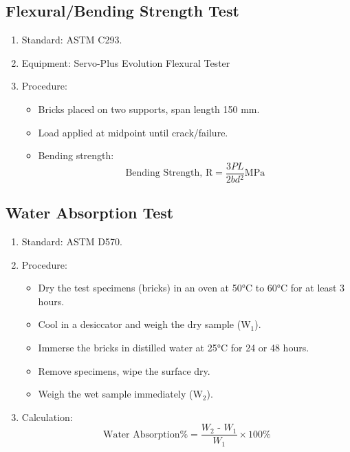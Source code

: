 \subsection{Flexural/Bending Strength Test}
\begin{enumerate}
	\item Standard: ASTM C293.
	\item Equipment: Servo-Plus Evolution Flexural Tester
	\item Procedure:
	      \begin{itemize}
		      \item Bricks placed on two supports, span length 150 mm.
		      \item Load applied at midpoint until crack/failure.
		      \item Bending strength:
		            \[
			            \text{Bending Strength, R} =
			            \frac{\textit{3PL}}{\textit{2bd$^2$}} \text{MPa}
		            \]
	      \end{itemize}
\end{enumerate}

\subsection{Water Absorption Test}
\begin{enumerate}
	\item Standard: ASTM D570.
	\item Procedure:
	      \begin{itemize}
		      \item Dry the test specimens (bricks) in an oven at 50°C to 60°C for at least 3 hours.
		      \item Cool in a desiccator and weigh the dry sample (W${_1}$).
		      \item Immerse the bricks in distilled water at 25°C for 24 or 48 hours.
		      \item Remove specimens, wipe the surface dry.
		      \item Weigh the wet sample immediately (W${_2}$).
	      \end{itemize}
	\item  Calculation:
	      \[
		      \text{Water Absorption\%} =
		      \frac{\textit{W${_2}$ - W${_1}$}}{\textit{W${_1}$}} \times 100\%
	      \]
\end{enumerate}